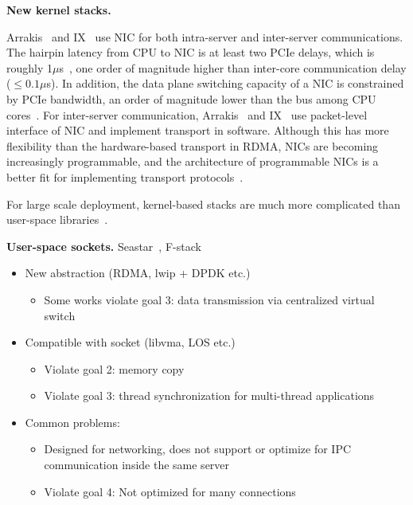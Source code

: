 \textbf{New kernel stacks.}


\iffalse
Kernel-bypass TCP/IPs
IX [OSDI’14], Arrakis [OSDI’14], UTCP [CCR’14], Sandstorm [SIGCOMM’14], mTCP [NSDI’14], Seastar

Socket API enhancements
MegaPipe [OSDI’12], FlexSC [OSDI’10], KCM [Linux]

Improving OS stack with fast packet I/O
mSwitch [SOSR’15]

In-stack improvement
FastSocket [ASPLOS’16]

Running kernel stack in user-space
Rump [AsiaBSDCon’09], NUSE [netdev’15]
\fi

Arrakis~\cite{peter2016arrakis} and IX~\cite{belay2017ix} use NIC for both intra-server and inter-server communications. The hairpin latency from CPU to NIC is at least two PCIe delays, which is roughly 1$\mu$s~\cite{kaminsky2016design}, one order of magnitude higher than inter-core communication delay ($\leq0.1\mu$s). In addition, the data plane switching capacity of a NIC is constrained by PCIe bandwidth, an order of magnitude lower than the bus among CPU cores~\cite{li2017kv}. For inter-server communication, Arrakis~\cite{peter2016arrakis} and IX~\cite{belay2017ix} use packet-level interface of NIC and implement transport in software. Although this has more flexibility than the hardware-based transport in RDMA, NICs are becoming increasingly programmable, and the architecture of programmable NICs is a better fit for implementing transport protocols~\cite{kaufmann2015flexnic,smartnic,mellanox,cavium}. 

For large scale deployment, kernel-based stacks are much more complicated than user-space libraries~\cite{andromeda}.

\textbf{User-space sockets.}
Seastar~\cite{seastar}, F-stack~\cite{fstack}


\begin{itemize}
	\item New abstraction (RDMA, lwip + DPDK etc.) 
	\begin{itemize}
		\item Some works violate goal 3: data transmission via centralized virtual switch 
	\end{itemize}
	\item Compatible with socket (libvma, LOS etc.) 
	\begin{itemize}
		\item Violate goal 2: memory copy 
		\item Violate goal 3: thread synchronization for multi-thread applications 
	\end{itemize}
	\item Common problems: 
	\begin{itemize}
		\item Designed for networking, does not support or optimize for IPC communication inside the same server 
		\item Violate goal 4: Not optimized for many connections 
	\end{itemize}
\end{itemize}


